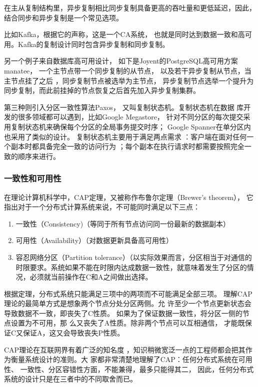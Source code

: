 在主从复制结构里，异步复制相比同步复制具备更高的吞吐量和更低延迟，因此，结合同步和异步复制是一个常见选项。

比如Kafka，根据它的声称，这是一个CA系统，
也就是同时达到数据一致和高可用。Kafka的复制设计同时包含异步复制和同步复制。

另一个例子来自数据库高可用设计，
如下是Joyent的PostgreSQL高可用方案manatee，
一个主节点带一个同步复制的从节点，
以及若干异步复制从节点，当主节点挂了之后
，同步复制节点被选举为主节点，
异步复制节点选举一个提升为同步复制，而此前挂掉的节点恢复之后首先加入异步复制集群。

第三种则引入分区一致性算法Paxos，
又叫复制状态机。复制状态机在数据
库开发的很多领域都可以遇到，比如Google Megastore，
针对不同分区的每次提交采用复制状态机来确保每个分区的全局事务提交时序；
Google Spanner在单分区内也采用了类似的设计。
复制状态机主要用于满足两点需求
：客户端在面对任何一个副本时都具备完全一致的访问行为
；每个副本在执行请求时都需要按照完全一致的顺序来进行。
\subsubsection{一致性和可用性}
在理论计算机科学中，CAP定理，又被称作布鲁尔定理（Brewer's theorem），
它指出对于一个分布式计算系统来说，不可能同时满足以下三点：
\begin{enumerate}
	\item 一致性（Consistency)（等同于所有节点访问同一份最新的数据副本）
	\item 	可用性（Availability）（对数据更新具备高可用性）
\item 	容忍网络分区（Partition tolerance）（以实际效果而言，分区相当于对通信的时限要求。系统如果不能在时限内达成数据一致性，就意味着发生了分区的情况，必须就当前操作在C和A之间做出选择。
\end{enumerate}
根据定理，分布式系统只能满足三项中的两项而不可能满足全部三项。
理解CAP理论的最简单方式是想象两个节点分处分区两侧。允
许至少一个节点更新状态会导致数据不一致，即丧失了C性质。
如果为了保证数据一致性，将分区一侧的节点设置为不可用，那
么又丧失了A性质。除非两个节点可以互相通信，
才能既保证C又保证A，这又会导致丧失P性质。

CAP理论在互联网界有着广泛的知名度
，知识稍微宽泛一点的工程师都会把其作为衡量系统设计的准则。大
家都非常清楚地理解了CAP：任何分布式系统在可用性、
一致性、分区容错性方面，不能兼得，最多只能得其二，
因此，任何分布式系统的设计只是在三者中的不同取舍而已。


